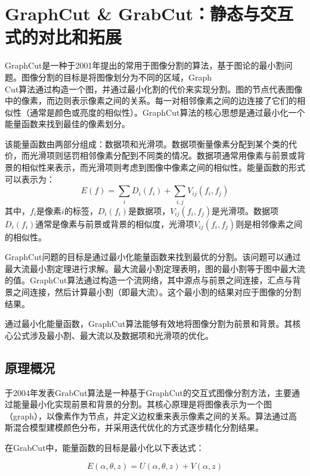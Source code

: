 \documentclass[UTF8]{ctexart}
\begin{document}
\section{GraphCut \& GrabCut：静态与交互式的对比和拓展}
GraphCut是一种于2001年提出的常用于图像分割的算法\cite{boykov_interactive_2001}，基于图论的最小割问题。图像分割的目标是将图像划分为不同的区域，Graph\\Cut算法通过构造一个图，并通过最小化割的代价来实现分割。图的节点代表图像中的像素，而边则表示像素之间的关系。每一对相邻像素之间的边连接了它们的相似性（通常是颜色或亮度的相似性）。GraphCut算法的核心思想是通过最小化一个能量函数来找到最佳的像素划分。\par
该能量函数由两部分组成：数据项和光滑项。数据项衡量像素分配到某个类的代价，而光滑项则惩罚相邻像素分配到不同类的情况。数据项通常用像素与前景或背景的相似性来表示，而光滑项则考虑到图像中像素之间的相似性。能量函数的形式可以表示为：
\[
E(f) = \sum_i D_i(f_i) + \sum_{i,j} V_{ij}(f_i, f_j)
\]
其中，$f_i$是像素$i$的标签，$D_i(f_i)$是数据项，$V_{ij}(f_i, f_j)$是光滑项。数据项$D_i(f_i)$通常是像素与前景或背景的相似度，光滑项$V_{ij}(f_i, f_j)$则是相邻像素之间的相似性。\par
GraphCut问题的目标是通过最小化能量函数来找到最优的分割。该问题可以通过最大流最小割定理进行求解。最大流最小割定理表明，图的最小割等于图中最大流的值。GraphCut算法通过构造一个流网络，其中源点与前景之间连接，汇点与背景之间连接，然后计算最小割（即最大流）。这个最小割的结果对应于图像的分割结果。\par
通过最小化能量函数，GraphCut算法能够有效地将图像分割为前景和背景。其核心公式涉及最小割、最大流以及数据项和光滑项的优化。
\subsection{原理概况}
于2004年发表GrabCut算法是一种基于GraphCut的交互式图像分割方法\cite{rother_grabcut_2004}，主要通过能量最小化实现前景和背景的分割。其核心原理是将图像表示为一个图（graph），以像素作为节点，并定义边权重来表示像素之间的关系。算法通过高斯混合模型建模颜色分布，并采用迭代优化的方式逐步精化分割结果。\par
在GrabCut中，能量函数的目标是最小化以下表达式：

\[
E(\alpha, \theta, z) = U(\alpha, \theta, z) + V(\alpha, z)
\]
\end{document}
